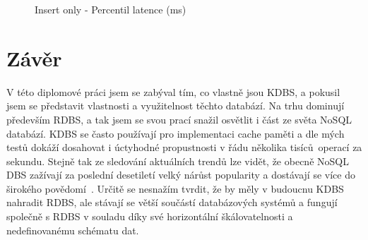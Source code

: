 \documentclass[czech,master,dept460,male,csharp,cpdeclaration]{diploma}
\begin{document}
	\begin{figure}
		\centering
		\caption{Insert only - Percentil latence (ms)}
		\label{graph_Insert only - Percentile Latency (ms)}
	\end{figure}
	
	\chapter{Závěr\label{chapter:5-diploma_results}}
	
	V této diplomové práci jsem se zabýval tím, co vlastně jsou KDBS, a pokusil jsem se představit vlastnosti a využitelnost těchto databází. Na trhu dominují především RDBS, a tak jsem se svou prací snažil osvětlit i část ze světa NoSQL databází. KDBS se často používají pro implementaci cache paměti a dle mých testů dokáží dosahovat i úctyhodné propustnosti v řádu několika tisíců~operací za sekundu. Stejně tak ze sledování aktuálních trendů lze vidět, že obecně NoSQL DBS zažívají za poslední desetiletí velký nárůst popularity a dostávají se více do širokého povědomí~\cite{dbranking-trend-by-model}. Určitě se nesnažím tvrdit, že by měly v budoucnu KDBS nahradit RDBS, ale stávají se větší součástí databázových systémů a fungují společně s RDBS v souladu díky své horizontální škálovatelnosti a nedefinovanému schématu dat.
	
\end{document}
